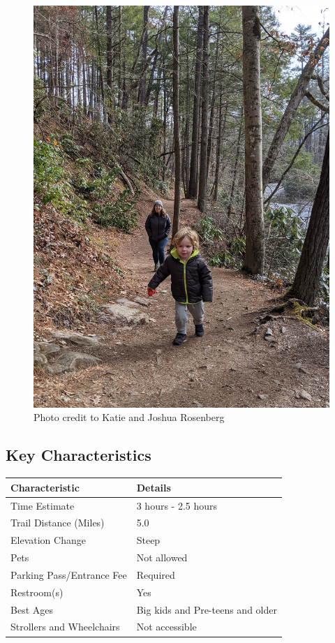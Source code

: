 \documentclass[
  letterpaper,
  DIV=11,
  numbers=noendperiod]{scrreprt}
\begin{document}
\begin{figure}[H]

{\centering \includegraphics[width=6.25in,height=\textheight,keepaspectratio]{img/trail-28-figure-01.jpg}

}

\caption{Photo credit to Katie and Joshua Rosenberg}

\end{figure}%

\subsection{Key Characteristics}\label{key-characteristics-28}

\begin{longtable}[]{@{}ll@{}}
\toprule\noalign{}
\textbf{Characteristic} & \textbf{Details} \\
\midrule\noalign{}
\endhead
\bottomrule\noalign{}
\endlastfoot
Time Estimate & 3 hours - 2.5 hours \\
Trail Distance (Miles) & 5.0 \\
Elevation Change & Steep \\
Pets & Not allowed \\
Parking Pass/Entrance Fee & Required \\
Restroom(s) & Yes \\
Best Ages & Big kids and Pre-teens and older \\
Strollers and Wheelchairs & Not accessible \\
\end{longtable}
\end{document}
